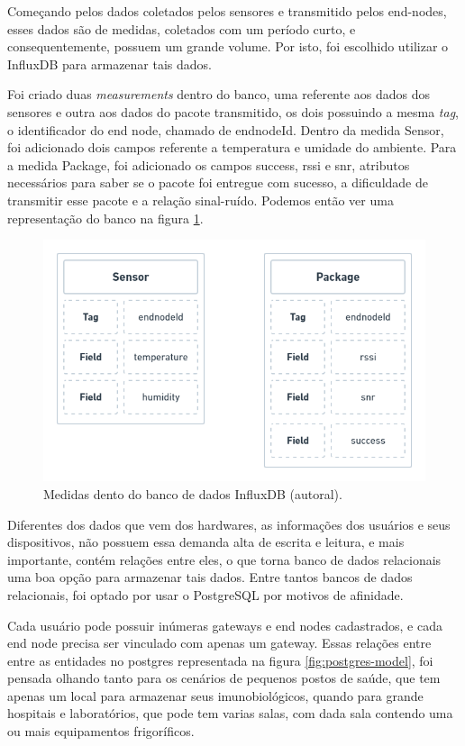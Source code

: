 Começando pelos dados coletados pelos sensores e transmitido pelos end-nodes, esses dados são de medidas, coletados com um período curto, e consequentemente, possuem um grande volume. Por isto, foi escolhido utilizar o InfluxDB para armazenar tais dados.

Foi criado duas \textit{measurements} dentro do banco, uma referente aos dados dos sensores e outra aos dados do pacote transmitido, os dois possuindo a mesma  \textit{tag}, o identificador do end node, chamado de endnodeId. Dentro da medida Sensor, foi adicionado dois campos referente a temperatura e umidade do ambiente. Para a medida Package, foi adicionado os campos success, rssi e snr, atributos necessários para saber se o pacote foi entregue com sucesso, a dificuldade de transmitir esse pacote e a relação sinal-ruído. Podemos então ver uma representação do banco na figura \ref{fig:influxdb-model}.

\begin{figure}[H]
  \centering
  \includegraphics[width=.80\textwidth]{assets/influx-model.png} 
  \caption{Medidas dento do banco de dados InfluxDB (autoral).}
  \label{fig:influxdb-model} 
\end{figure}

Diferentes dos dados que vem dos hardwares, as informações dos usuários e seus dispositivos, não possuem essa demanda alta de escrita e leitura, e mais importante, contém relações entre eles, o que torna banco de dados relacionais uma boa opção para armazenar tais dados. Entre tantos bancos de dados relacionais, foi optado por usar o PostgreSQL por motivos de afinidade.

Cada usuário pode possuir inúmeras gateways e end nodes cadastrados, e cada end node precisa ser vinculado com apenas um gateway. Essas relações entre entre as entidades no postgres representada na figura \ref{fig:postgres-model}, foi pensada olhando tanto para os cenários de pequenos postos de saúde, que tem apenas um local para armazenar seus imunobiológicos, quando para grande hospitais e laboratórios, que pode tem varias salas, com dada sala contendo uma ou mais equipamentos frigoríficos.

